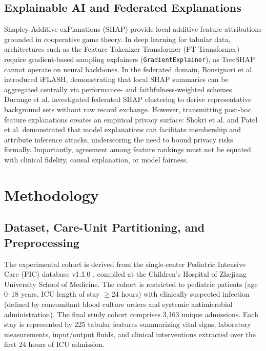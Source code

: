 \documentclass[sigconf,review,anonymous]{acmart}
\begin{document}
\subsection{Explainable AI and Federated Explanations}
Shapley Additive exPlanations (SHAP) \cite{lundberg2017shap} provide local additive feature attributions grounded in cooperative game theory. In deep learning for tabular data, architectures such as the Feature Tokenizer Transformer (FT-Transformer) \cite{gorishniy2021revisiting} require gradient-based sampling explainers (\texttt{GradientExplainer}), as TreeSHAP cannot operate on neural backbones. In the federated domain, Bonsignori et al. \cite{bonsignori2026interpreting} introduced iFLASH, demonstrating that local SHAP summaries can be aggregated centrally via performance- and faithfulness-weighted schemes. Ducange et al. \cite{ducange2026federated} investigated federated SHAP clustering to derive representative background sets without raw record exchange. However, transmitting post-hoc feature explanations creates an empirical privacy surface: Shokri et al. \cite{shokri2021privacy} and Patel et al. \cite{patel2022model} demonstrated that model explanations can facilitate membership and attribute inference attacks, underscoring the need to bound privacy risks formally. Importantly, agreement among feature rankings must not be equated with clinical fidelity, causal explanation, or model fairness.

\section{Methodology}\label{sec:method}

\subsection{Dataset, Care-Unit Partitioning, and Preprocessing}
The experimental cohort is derived from the single-center Pediatric Intensive Care (PIC) database v1.1.0 \cite{zeng2020pic}, compiled at the Children's Hospital of Zhejiang University School of Medicine. The cohort is restricted to pediatric patients (age 0--18 years, ICU length of stay $\ge 24$ hours) with clinically suspected infection (defined by concomitant blood culture orders and systemic antimicrobial administration). The final study cohort comprises 3,163 unique admissions. Each stay is represented by 225 tabular features summarizing vital signs, laboratory measurements, input/output fluids, and clinical interventions extracted over the first 24 hours of ICU admission.
\end{document}
